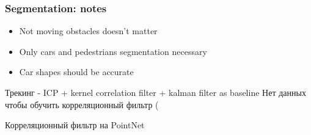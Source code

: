 \documentclass[xcolor=table,usenames,dvipsnames]{beamer}
\begin{document}
\begin{frame}
\frametitle{Segmentation: notes}
\begin{itemize}
\item Not moving obstacles doesn't matter
\item Only cars and pedestrians segmentation necessary
\item Car shapes should be accurate
\end{itemize}
\end{frame}
\begin{frame}
Трекинг - ICP + kernel correlation filter + kalman filter as baseline
Нет данных чтобы обучить корреляционный фильтр (
\end{frame}
\begin{frame}
Корреляционный фильтр на PointNet
\end{frame}
\end{document}
